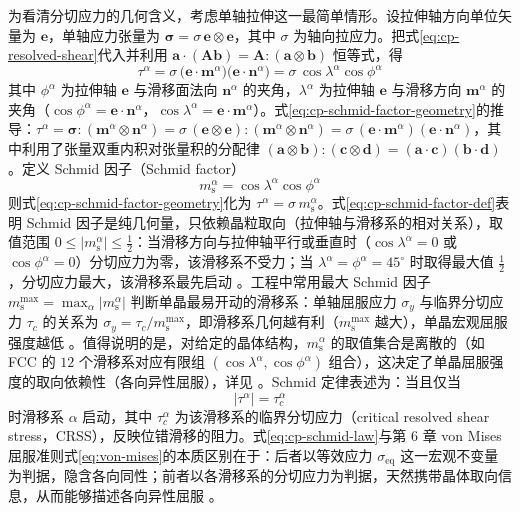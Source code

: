 为看清分切应力的几何含义，考虑单轴拉伸这一最简单情形。设拉伸轴方向单位矢量为 $\mathbf{e}$，单轴应力张量为 $\boldsymbol{\sigma}=\sigma\,\mathbf{e}\otimes\mathbf{e}$，其中 $\sigma$ 为轴向拉应力。把式\eqref{eq:cp-resolved-shear}代入并利用 $\mathbf{a}\cdot(\mathbf{A}\mathbf{b})=\mathbf{A}:(\mathbf{a}\otimes\mathbf{b})$ 恒等式，得
\begin{equation}
  \tau^{\alpha}
  =\sigma\,\bigl(\mathbf{e}\cdot\mathbf{m}^{\alpha}\bigr)\bigl(\mathbf{e}\cdot\mathbf{n}^{\alpha}\bigr)
  =\sigma\,\cos\lambda^{\alpha}\cos\phi^{\alpha}
  \label{eq:cp-schmid-factor-geometry}
\end{equation}
其中 $\phi^{\alpha}$ 为拉伸轴 $\mathbf{e}$ 与滑移面法向 $\mathbf{n}^{\alpha}$ 的夹角，$\lambda^{\alpha}$ 为拉伸轴 $\mathbf{e}$ 与滑移方向 $\mathbf{m}^{\alpha}$ 的夹角（$\cos\phi^{\alpha}=\mathbf{e}\cdot\mathbf{n}^{\alpha}$，$\cos\lambda^{\alpha}=\mathbf{e}\cdot\mathbf{m}^{\alpha}$）。式\eqref{eq:cp-schmid-factor-geometry}的推导：$\tau^{\alpha}=\boldsymbol{\sigma}:(\mathbf{m}^{\alpha}\otimes\mathbf{n}^{\alpha})=\sigma\,(\mathbf{e}\otimes\mathbf{e}):(\mathbf{m}^{\alpha}\otimes\mathbf{n}^{\alpha})=\sigma\,(\mathbf{e}\cdot\mathbf{m}^{\alpha})(\mathbf{e}\cdot\mathbf{n}^{\alpha})$，其中利用了张量双重内积对张量积的分配律 $(\mathbf{a}\otimes\mathbf{b}):(\mathbf{c}\otimes\mathbf{d})=(\mathbf{a}\cdot\mathbf{c})(\mathbf{b}\cdot\mathbf{d})$。定义 Schmid 因子（Schmid factor）
\begin{equation}
  m^{\alpha}_{\mathrm{s}}=\cos\lambda^{\alpha}\cos\phi^{\alpha}
  \label{eq:cp-schmid-factor-def}
\end{equation}
则式\eqref{eq:cp-schmid-factor-geometry}化为 $\tau^{\alpha}=\sigma\,m^{\alpha}_{\mathrm{s}}$。式\eqref{eq:cp-schmid-factor-def}表明 Schmid 因子是纯几何量，只依赖晶粒取向（拉伸轴与滑移系的相对关系），取值范围 $0\le |m^{\alpha}_{\mathrm{s}}|\le\tfrac{1}{2}$：当滑移方向与拉伸轴平行或垂直时（$\cos\lambda^{\alpha}=0$ 或 $\cos\phi^{\alpha}=0$）分切应力为零，该滑移系不受力；当 $\lambda^{\alpha}=\phi^{\alpha}=45^{\circ}$ 时取得最大值 $\tfrac{1}{2}$，分切应力最大，该滑移系最先启动 \cite{Taylor1938}。工程中常用最大 Schmid 因子 $m^{\max}_{\mathrm{s}}=\max_{\alpha}|m^{\alpha}_{\mathrm{s}}|$ 判断单晶最易开动的滑移系：单轴屈服应力 $\sigma_{y}$ 与临界分切应力 $\tau_{c}$ 的关系为 $\sigma_{y}=\tau_{c}/m^{\max}_{\mathrm{s}}$，即滑移系几何越有利（$m^{\max}_{\mathrm{s}}$ 越大），单晶宏观屈服强度越低 \cite{Asaro1983}。值得说明的是，对给定的晶体结构，$m^{\alpha}_{\mathrm{s}}$ 的取值集合是离散的（如 FCC 的 $12$ 个滑移系对应有限组 $(\cos\lambda^{\alpha},\cos\phi^{\alpha})$ 组合），这决定了单晶屈服强度的取向依赖性（各向异性屈服），详见 \cite{Roters2010}。Schmid 定律表述为：当且仅当
\begin{equation}
  |\tau^{\alpha}|=\tau_{c}^{\alpha}
  \label{eq:cp-schmid-law}
\end{equation}
时滑移系 $\alpha$ 启动，其中 $\tau_{c}^{\alpha}$ 为该滑移系的临界分切应力（critical resolved shear stress，CRSS），反映位错滑移的阻力。式\eqref{eq:cp-schmid-law}与第 6 章 von Mises 屈服准则式\eqref{eq:von-mises}的本质区别在于：后者以等效应力 $\sigma_{\mathrm{eq}}$ 这一宏观不变量为判据，隐含各向同性；前者以各滑移系的分切应力为判据，天然携带晶体取向信息，从而能够描述各向异性屈服 \cite{Taylor1938,Asaro1983}。

